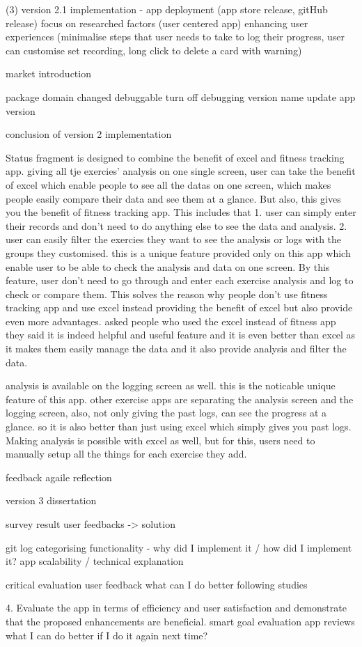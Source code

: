 (3) version 2.1 implementation - app deployment (app store release, gitHub release)
focus on researched factors (user centered app)
enhancing user experiences
(minimalise steps that user needs to take to log their progress, user can customise set recording, long click to delete a card with warning)

market introduction

package domain changed
debuggable
turn off debugging
version name update
app version


conclusion of version 2 implementation

Status fragment is designed to combine the benefit of excel and fitness tracking app.
giving all tje exercies' analysis on one single screen, user can take the benefit of excel which enable people to see all the datas on one screen,
which makes people easily compare their data and see them at a glance.
But also, this gives you the benefit of fitness tracking app.
This includes that
1. user can simply enter their records and don't need to do anything else to see the data and analysis.
2. user can easily filter the exercies they want to see the analysis or logs with the groups they customised.
this is a unique feature provided only on this app which enable user to be able to check the analysis and data on one screen.
By this feature, user don't need to go through and enter each exercise analysis and log to check or compare them.
This solves the reason why people don't use fitness tracking app and use excel instead providing the benefit of excel but also provide even more advantages.
asked people who used the excel instead of fitness app
they said it is indeed helpful and useful feature
and it is even better than excel
as it makes them easily manage the data and it also provide analysis and filter the data.

analysis is available on the logging screen as well.
this is the noticable unique feature of this app. 
other exercise apps are separating the analysis screen and the logging screen, 
also, not only giving the past logs, can see the progress at a glance. 
so it is also better than just using excel which simply gives you past logs.
Making analysis is possible with excel as well, but for this, users need to manually setup all the things for each exercise they add.

feedback agaile reflection


version 3 dissertation

survey result
user feedbacks -> solution


git log categorising
functionality - why did I implement it / how did I implement it?
app scalability / technical explanation



critical evaluation
user feedback
what can I do better
following studies

4. Evaluate the app in terms of efficiency and user satisfaction and demonstrate that the proposed enhancements are beneficial.
	smart goal evaluation
	app reviews
	what I can do better if I do it again next time?